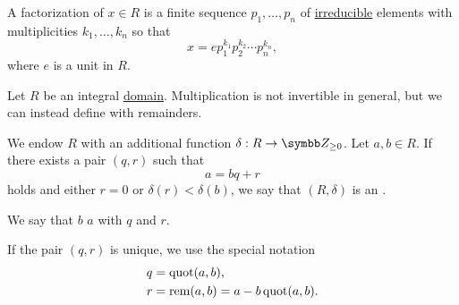 \begin{definition}\label{def:factorization_in_ring}
  A factorization of \( x \in R \) is a finite sequence \( p_1, \ldots, p_n \) of \hyperref[def:irreducible_ring_element]{irreducible} elements with multiplicities \( k_1, \ldots, k_n \) so that
  \begin{equation*}
    x = e p_1^{k_1} p_2^{k_2} \cdots p_n^{k_n},
  \end{equation*}
  where \( e \) is a unit in \( R \).
\end{definition}

\begin{definition}\label{def:euclidean_domain}\cite{nLab:euclidean_domain}
  Let \( R \) be an integral \hyperref[def:semiring/integral_domain]{domain}. Multiplication is not invertible in general, but we can instead define  with remainders.

  We endow \( R \) with an additional function \( \delta: R \to \BZ_{\geq 0} \). Let \( a, b \in R \). If there exists a pair \( (q, r) \) such that
  \begin{equation*}
    a = bq + r
  \end{equation*}
  holds and either \( r = 0 \) or \( \delta(r) < \delta(b) \), we say that \( (R, \delta) \) is an .

  We say that \( b \)  \( a \) with  \( q \) and  \( r \).

  If the pair \( (q, r) \) is unique, we use the special notation
  \begin{align*}
    q &= \operatorname{quot}(a, b), \\
    r &= \operatorname{rem}(a, b) = a - b \operatorname{quot}(a, b).
  \end{align*}
\end{definition}

